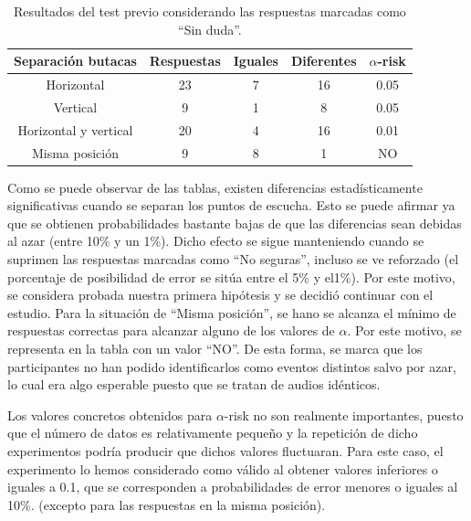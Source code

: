 \documentclass[11pt,a4paper,twoside]{book}
\begin{document}
		\begin{table}[H]
			\begin{center}
			\begin{scriptsize}
			\begin{tabular}{| c | c | c | c || c |}
			    \hline
				\textbf{Separación butacas}&\textbf{Respuestas}&\textbf{Iguales}&\textbf{Diferentes}&\textbf{$\alpha$-risk}\\ \hline
                Horizontal&23&7&16&0.05\\ \hline
                Vertical&9&1&8&0.05\\ \hline
                Horizontal y vertical&20&4&16&0.01\\ \hline
                Misma posición&9&8&1&NO\\ \hline
			\end{tabular}
			\caption{Resultados del test previo considerando las respuestas marcadas como ``Sin duda''.}
			\label{tablaResultadosSinDuda}
			\end{scriptsize}
			\end{center}	
		\end{table}
		
		Como se puede observar de las tablas, existen diferencias estadísticamente significativas cuando se separan los puntos de escucha. Esto se puede afirmar ya que se obtienen probabilidades bastante bajas de que las diferencias sean debidas al azar (entre 10\% y un 1\%). Dicho efecto se sigue manteniendo cuando se suprimen las respuestas marcadas como ``No seguras'', incluso se ve reforzado (el porcentaje de posibilidad de error se sitúa entre el 5\% y el1\%). Por este motivo, se considera probada nuestra primera hipótesis y se decidió continuar con el estudio. Para la situación de ``Misma posición'', se hano se alcanza el mínimo de respuestas correctas para alcanzar alguno de los valores de $\alpha$. Por este motivo, se representa en la tabla con un valor ``NO''. De esta forma, se marca que los participantes no han podido identificarlos como eventos distintos salvo por azar, lo cual era algo esperable puesto que se tratan de audios idénticos.
		
		Los valores concretos obtenidos para $\alpha$-risk no son realmente importantes, puesto que el número de datos es relativamente pequeño y la repetición de dicho experimentos podría producir que dichos valores fluctuaran. Para este caso, el experimento lo hemos considerado como válido al obtener valores inferiores o iguales a 0.1, que se corresponden a probabilidades de error menores o iguales al 10\%. (excepto para las respuestas en la misma posición).
		
\end{document}
